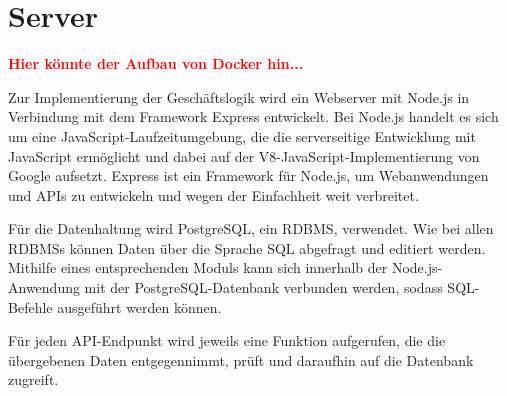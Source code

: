 \section{Server}

\textcolor{red}{\textbf{Hier könnte der Aufbau von Docker hin...}}

Zur Implementierung der Geschäftslogik wird ein Webserver mit Node.js in Verbindung mit dem Framework Express entwickelt.
Bei Node.js handelt es sich um eine JavaScript-Laufzeitumgebung, die die serverseitige Entwicklung mit JavaScript ermöglicht und dabei auf der V8-JavaScript-Implementierung von Google aufsetzt.\autocite[Vgl.][]{nl-openjsfoundation2020nodejs}
Express ist ein Framework für Node.js, um Webanwendungen und \acsp{API} zu entwickeln und wegen der Einfachheit weit verbreitet.\autocite[Vgl.][]{nl-strongloop2017express}

Für die Datenhaltung wird PostgreSQL, ein \ac{RDBMS}, verwendet.
Wie bei allen \acsp{RDBMS} können Daten über die Sprache \acs{SQL} abgefragt und editiert werden.
Mithilfe eines entsprechenden Moduls kann sich innerhalb der Node.js-Anwendung mit der PostgreSQL-Datenbank verbunden werden, sodass \acs{SQL}-Befehle ausgeführt werden können.\autocite[Vgl.][]{nl-carlson2020nodepostgres}

Für jeden \acs{API}-Endpunkt wird jeweils eine Funktion aufgerufen, die die übergebenen Daten entgegennimmt, prüft und daraufhin auf die Datenbank zugreift.
